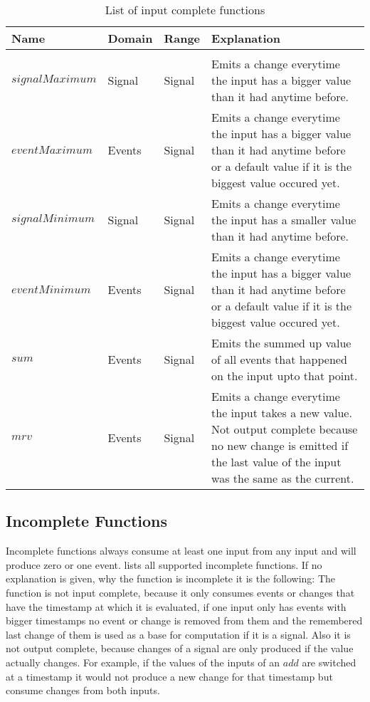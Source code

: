 \begin{table}[!htb]
  \begin{tabularx}{\textwidth}{lllX}
    Name                 & Domain  & Range   & Explanation \\
    \toprule \\
    \(\mathit{signalMaximum}\)    & Signal  & Signal  & Emits a change everytime the input has a bigger value than it had anytime before. \\
    \(\mathit{eventMaximum}\)     & Events  & Signal  & Emits a change everytime the input has a bigger value than it had anytime before or a default value if it is the biggest value occured yet. \\
    \(\mathit{signalMinimum}\)    & Signal  & Signal  & Emits a change everytime the input has a smaller value than it had anytime before. \\
    \(\mathit{eventMinimum}\)     & Events  & Signal  & Emits a change everytime the input has a bigger value than it had anytime before or a default value if it is the biggest value occured yet. \\
    \(\mathit{sum}\)              & Events  & Signal  & Emits the summed up value of all events that happened on the input upto that point. \\
    \(\mathit{mrv}\)              & Events  & Signal  & Emits a change everytime the input takes a new value. Not output complete because no new change is emitted if the last value of the input was the same as the current.
  \end{tabularx}
\caption{List of input complete functions}
\label{table:input_complete_functions}
\end{table}


\subsection{Incomplete Functions}
\label{sec:definitions:tessla_functions:incomplete}
Incomplete functions always consume at least one input from any input and will produce zero or one event.
 lists all supported incomplete functions.
If no explanation is given, why the function is incomplete it is the following:
The function is not input complete, because it only consumes events or changes that have the timestamp at which it is evaluated, if one input only has events with bigger timestamps no event or change is removed from them and the remembered last change of them is used as a base for computation if it is a signal.
Also it is not output complete, because changes of a signal are only produced if the value actually changes.
For example, if the values of the inputs of an \(\mathit{add}\) are switched at a timestamp it would not produce a new change for that timestamp but consume changes from both inputs.

